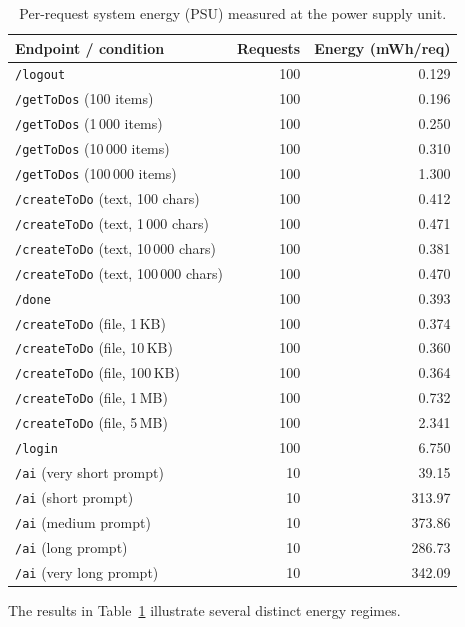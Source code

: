 \begin{table}[h]
\centering
\caption{Per-request system energy (PSU) measured at the power supply unit.}
\label{tab:energy}
\begin{tabular}{lrr}
\toprule
\textbf{Endpoint / condition} & \textbf{Requests} & \textbf{Energy (mWh/req)} \\
\midrule
\texttt{/logout}                  & 100 & 0.129 \\
\texttt{/getToDos} (100 items)    & 100 & 0.196 \\
\texttt{/getToDos} (1\,000 items) & 100 & 0.250 \\
\texttt{/getToDos} (10\,000 items)& 100 & 0.310 \\
\texttt{/getToDos} (100\,000 items)&100 & 1.300 \\
\texttt{/createToDo} (text, 100 chars)   & 100 & 0.412 \\
\texttt{/createToDo} (text, 1\,000 chars)& 100 & 0.471 \\
\texttt{/createToDo} (text, 10\,000 chars)&100 & 0.381 \\
\texttt{/createToDo} (text, 100\,000 chars)&100 & 0.470 \\
\texttt{/done}                    & 100 & 0.393 \\
\texttt{/createToDo} (file, 1\,KB)  & 100 & 0.374 \\
\texttt{/createToDo} (file, 10\,KB) & 100 & 0.360 \\
\texttt{/createToDo} (file, 100\,KB)& 100 & 0.364 \\
\texttt{/createToDo} (file, 1\,MB)  & 100 & 0.732 \\
\texttt{/createToDo} (file, 5\,MB)  & 100 & 2.341 \\
\texttt{/login}                   & 100 & 6.750 \\
\midrule
\texttt{/ai} (very short prompt)  &  10 & 39.15  \\
\texttt{/ai} (short prompt)       &  10 & 313.97 \\
\texttt{/ai} (medium prompt)      &  10 & 373.86 \\
\texttt{/ai} (long prompt)        &  10 & 286.73 \\
\texttt{/ai} (very long prompt)   &  10 & 342.09 \\
\bottomrule
\end{tabular}
\end{table}

The results in Table~\ref{tab:energy} illustrate several distinct energy regimes.

